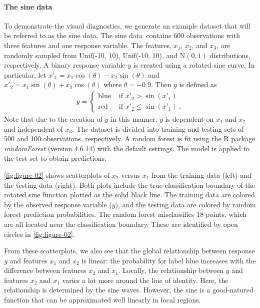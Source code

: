 \documentclass[AMS,STIX2COL]{WileyNJD-v2}\usepackage[]{graphicx}\usepackage[]{color}
\newcommand{\data}{sine data}
\begin{document}
\paragraph{The \data}

To demonstrate the visual diagnostics, we generate an example dataset that will be referred to as the \data. The \data \ contains 600 observations with three features and one response variable. The features, $x_1$, $x_2$, and $x_3$, are randomly sampled from Unif(-10, 10), Unif(-10, 10), and $\mbox{N}(0,1)$ distributions, respectively. A binary response variable $y$ is  created using a rotated sine curve. In particular, let $x'_1=x_1\cos(\theta)-x_2\sin(\theta)$ and $x'_2=x_1\sin(\theta)+x_2\cos(\theta)$ where $\theta=-0.9$. Then $y$ is defined as
\begin{eqnarray}\label{eq:data}
  y=\begin{cases}
  \mbox{blue} & \mbox{ if } x'_2 > \sin\left(x'_1\right) \\
  \mbox{red} & \mbox{ if } x'_2 \le \sin\left(x'_1\right) \ . %
  \end{cases}
\end{eqnarray}
Note that due to the creation of $y$ in this manner, $y$ is dependent on $x_1$ and $x_2$ and independent of $x_3$. The dataset is divided into training and testing sets of 500 and 100 observations, respectively.  A random forest  is fit using the R package \emph{randomForest} (version 4.6.14) \citep{liaw:2002} with the default settings. The model is applied to the test set to obtain predictions. 

\autoref{fig:figure-02} shows scatterplots of $x_2$ versus $x_1$ from the training data (left) and the testing data (right). Both plots include the true classification boundary of the rotated sine function plotted as the solid black line. The training data are colored by the observed response variable ($y$), and the testing data are colored by random forest  prediction probabilities. The random forest  misclassifies 18 points, which are all located near  the classification boundary. These are identified by open circles in \autoref{fig:figure-02}. 

From these scatterplots, we also see that the global relationship between response $y$ and features $x_1$ and $x_2$ is linear: the probability for label blue increases with the difference between features $x_2$ and $x_1$. Locally, the relationship between $y$ and features $x_2$ and $x_1$ varies a lot more around the line of identity. Here, the relationship is determined by the sine waves. However, the sine is a good-natured function that can be approximated well linearly in local regions.
\end{document}
